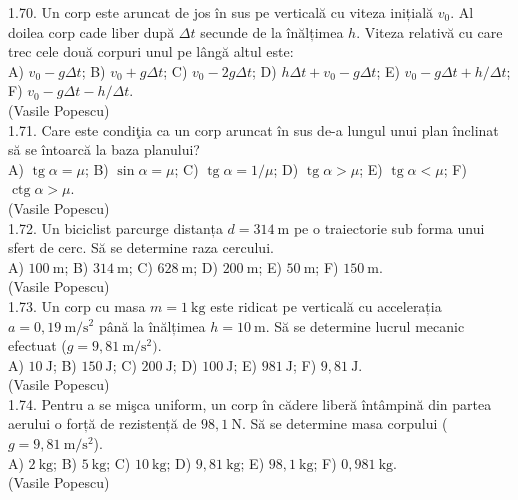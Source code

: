 1.70. Un corp este aruncat de jos în sus pe verticală cu viteza inițială $v_{0}$. Al doilea corp cade liber după $\Delta t$ secunde de la înălțimea $h$. Viteza relativă cu care trec cele două corpuri unul pe lângă altul este:\\ A) $v_{0}-g \Delta t$; B) $v_{0}+g \Delta t$; C) $v_{0}-2 g \Delta t$; D) $h \Delta t+v_{0}-g \Delta t$; E) $v_{0}-g \Delta t+h / \Delta t$; F) $v_{0}-g \Delta t-h / \Delta t$.\\ (Vasile Popescu)\\

1.71. Care este condiţia ca un corp aruncat în sus de-a lungul unui plan înclinat să se întoarcă la baza planului?\\ A) $\operatorname{tg} \alpha=\mu$; B) $\sin \alpha=\mu$; C) $\operatorname{tg} \alpha=1 / \mu$; D) $\operatorname{tg} \alpha>\mu$; E) $\operatorname{tg} \alpha<\mu$; F) $\operatorname{ctg} \alpha>\mu$.\\ (Vasile Popescu)\\

1.72. Un biciclist parcurge distanța $d=314 \mathrm{~m}$ pe o traiectorie sub forma unui sfert de cerc. Să se determine raza cercului.\\ A) $100 \mathrm{~m}$; B) $314 \mathrm{~m}$; C) $628 \mathrm{~m}$; D) $200 \mathrm{~m}$; E) $50 \mathrm{~m}$; F) $150 \mathrm{~m}$.\\ (Vasile Popescu)\\

1.73. Un corp cu masa $m=1 \mathrm{~kg}$ este ridicat pe verticală cu accelerația $a=0,19 \mathrm{~m} / \mathrm{s}^{2}$ până la înălțimea $h=10 \mathrm{~m}$. Să se determine lucrul mecanic efectuat ($g=9,81 \mathrm{~m} / \mathrm{s}^{2})$.\\ A) $10 \mathrm{~J}$; B) $150 \mathrm{~J}$; C) $200 \mathrm{~J}$; D) $100 \mathrm{~J}$; E) $981 \mathrm{~J}$; F) $9,81 \mathrm{~J}$.\\ (Vasile Popescu)\\

1.74. Pentru a se mişca uniform, un corp în cădere liberă întâmpină din partea aerului o forță de rezistență de $98,1 \mathrm{~N}$. Să se determine masa corpului ($g=9,81 \mathrm{~m} / \mathrm{s}^{2}$).\\ A) $2 \mathrm{~kg}$; B) $5 \mathrm{~kg}$; C) $10 \mathrm{~kg}$; D) $9,81 \mathrm{~kg}$; E) $98,1 \mathrm{~kg}$; F) $0,981 \mathrm{~kg}$.\\ (Vasile Popescu)\\

